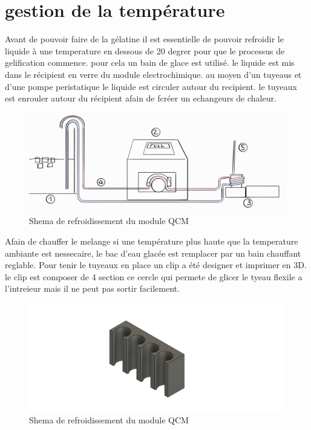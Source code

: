 \section{gestion de la température}
Avant de pouvoir faire de la gélatine il est essentielle de pouvoir refroidir le liquide à une temperature en dessous de 20 degrer pour que le processus de gelification commence. 
pour cela un bain de glace est utilisé. le liquide est mis dans le récipient en verre du module electrochimique. au moyen d'un tuyeaus et d'une pompe peristatique le liquide est circuler autour du recipient. le tuyeaux est enrouler autour du récipient afain de fcréer un echangeurs de chaleur.
\begin{figure}[H]
    \centering
    \includegraphics[width=\textwidth]{assets/figures/Pump TB.png}
    \caption{Shema de refroidissement du module QCM}
    \label{fig:Shema_glacière}
\end{figure}
Afain de chauffer le melange si une température plus haute que la temperature ambiante est nessecaire, le bac d'eau glacée est remplacer par un bain chauffant reglable.
Pour tenir le tuyeaux en place un clip a été designer et imprimer en 3D. le clip est composer de 4 section ce cercle qui permete de glicer le tyeau flexile a l'intreieur mais il ne peut pas sortir facilement. 
\begin{figure}[H]
    \centering
    \includegraphics[width=\textwidth]{assets/figures/ATACHE TUBE V2.png}
    \caption{Shema de refroidissement du module QCM}
    \label{fig:Shema_glacière}
\end{figure}

